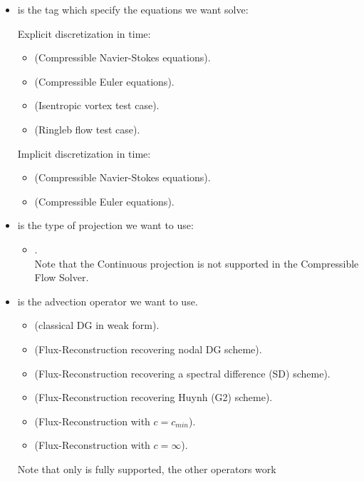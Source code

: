 \begin{itemize}
  \item {} is the tag which specify the equations we want solve:

    Explicit discretization in time:
    \begin{itemize}
      \item {} (Compressible Navier-Stokes equations).
      \item {} (Compressible Euler equations).
      \item {} (Isentropic vortex test case).
      \item {} (Ringleb flow test case).
    \end{itemize}

    Implicit discretization in time:
    \begin{itemize}
      \item {} (Compressible Navier-Stokes equations).
      \item {} (Compressible Euler equations).
    \end{itemize}
  \item {} is the type of projection we want to use:
    \begin{itemize}
      \item {}.\\
        Note that the Continuous projection is not supported in the Compressible Flow Solver.
    \end{itemize}
  \item {} is the advection operator we want to use.
    \begin{itemize}
      \item {} (classical DG in weak form).
      \item {} (Flux-Reconstruction recovering nodal DG scheme).
      \item {} (Flux-Reconstruction recovering a spectral difference (SD) scheme).
      \item {} (Flux-Reconstruction recovering Huynh (G2) scheme).
      \item {} (Flux-Reconstruction with $c = c_{min}$).
      \item {} (Flux-Reconstruction with $c = \infty$).
    \end{itemize}
    Note that only  is fully supported, the other operators work

\end{itemize}
